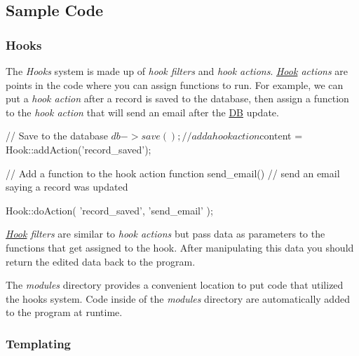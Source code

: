 \subsection*{Sample Code}

\subsubsection*{Hooks}

The {\itshape Hooks} system is made up of {\itshape hook filters} and {\itshape hook actions}. {\itshape \hyperlink{class_hook}{Hook} actions} are points in the code where you can assign functions to run. For example, we can put a {\itshape hook action} after a record is saved to the database, then assign a function to the {\itshape hook action} that will send an email after the \hyperlink{class_d_b}{D\-B} update. \begin{DoxyVerb}// Save to the database
$db->save();

// add a hook action
$content = Hook::addAction('record_saved');

// Add a function to the hook action
function send_email() {
    // send an email saying a record was updated
}

Hook::doAction(
    'record_saved',
    'send_email'
);
\end{DoxyVerb}


{\itshape \hyperlink{class_hook}{Hook} filters} are similar to {\itshape hook actions} but pass data as parameters to the functions that get assigned to the hook. After manipulating this data you should return the edited data back to the program. 


The {\itshape modules} directory provides a convenient location to put code that utilized the hooks system. Code inside of the {\itshape modules} directory are automatically added to the program at runtime.

\subsubsection*{Templating}

